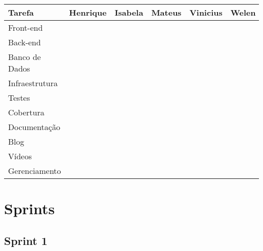 		\begin{table}[]
			\begin{tabular}{|l|l|l|l|l|l|}
				\hline
				Tarefa         & Henrique & Isabela & Mateus & Vinicius & Welen \\ \hline
				Front-end      &          &         &        &          &       \\ \hline
				Back-end       &          &         &        &          &       \\ \hline
				Banco de Dados &          &         &        &          &       \\ \hline
				Infraestrutura &          &         &        &          &       \\ \hline
				Testes         &          &         &        &          &       \\ \hline
				Cobertura      &          &         &        &          &       \\ \hline
				Documentação   &          &         &        &          &       \\ \hline
				Blog           &          &         &        &          &       \\ \hline
				Vídeos         &          &         &        &          &       \\ \hline
				Gerenciamento  &          &         &        &          &       \\ \hline
			\end{tabular}
			\end{table}

	\section{Sprints}
	\subsection{Sprint 1}